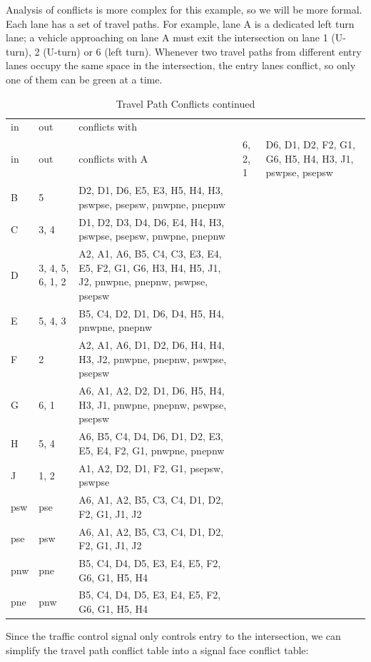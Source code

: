 \documentclass[letterpaper,twoside]{article}
\begin{document}
Analysis of conflicts is more complex for this example, so we
will be more formal.  Each lane has a set of travel paths.
For example, lane A is a dedicated left turn lane; a vehicle approaching on
lane A must exit the intersection on lane 1 (U-turn), 2 (U-turn)
or 6 (left turn).  Whenever two travel paths from different entry lanes
occupy the same space in the intersection, the entry lanes
conflict, so only one of them can be green at a time.

\begin{longtable}{l | l | p{8cm}}
  \caption{Travel Path Conflicts} \\
  in & out & conflicts with \endfirsthead
  \caption{Travel Path Conflicts continued} \\
  in & out & conflicts with \endhead
  \hline
  A & 6, 2, 1 & D6, D1, D2, F2, G1, G6, H5, H4, H3, J1, pswpse, psepsw \\
  B & 5 & D2, D1, D6, E5, E3, H5, H4, H3, pswpse, psepsw, pnwpne, pnepnw \\
  C & 3, 4 & D1, D2, D3, D4, D6, E4, H4, H3, pswpse, psepsw, pnwpne, pnepnw \\
  D & 3, 4, 5, 6, 1, 2 & A2, A1, A6, B5, C4, C3, E3, E4, E5, F2, G1, G6, H3,
  H4, H5, J1, J2, pnwpne, pnepnw, pswpse, psepsw \\
  E & 5, 4, 3 & B5, C4, D2, D1, D6, D4, H5, H4, pnwpne, pnepnw  \\
  F & 2 & A2, A1, A6, D1, D2, D6, H4, H4, H3, J2, pnwpne, pnepnw, pswpse,
  psepsw \\
  G & 6, 1 & A6, A1, A2, D2, D1, D6, H5, H4, H3, J1, pnwpne, pnepnw, pswpse,
  psepsw \\
  H & 5, 4 & A6, B5, C4, D4, D6, D1, D2, E3, E5, E4, F2, G1, pnwpne, pnepnw \\
  J & 1, 2 & A1, A2, D2, D1, F2, G1, psepsw, pswpse \\
  psw & pse & A6, A1, A2, B5, C3, C4, D1, D2, F2, G1, J1, J2 \\
  pse & psw & A6, A1, A2, B5, C3, C4, D1, D2, F2, G1, J1, J2 \\
  pnw & pne & B5, C4, D4, D5, E3, E4, E5, F2, G6, G1, H5, H4 \\
  pne & pnw & B5, C4, D4, D5, E3, E4, E5, F2, G6, G1, H5, H4 \\
\end{longtable}

Since the traffic control signal only controls entry to the
intersection, we can simplify the travel path conflict table into a signal face
conflict table:
\end{document}
